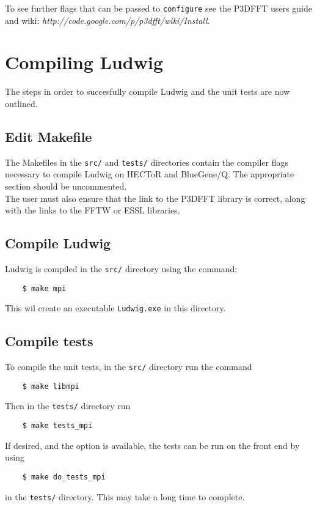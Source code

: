 \documentclass[12pt,a4paper]{article}
\begin{document}
To see further flags that can be passed to \texttt{configure} see the P3DFFT users guide and wiki: \textit{http://code.google.com/p/p3dfft/wiki/Install}.

\section{Compiling Ludwig}
The steps in order to succesfully compile Ludwig and the unit tests are now outlined.

\subsection{Edit Makefile}
  The Makefiles in the \texttt{src/} and \texttt{tests/} directories contain the compiler flags necessary to compile Ludwig on HECToR and BlueGene/Q. The appropriate section should be uncommented.\\
  The user must also ensure that the link to the P3DFFT library is correct, along with the links to the FFTW or ESSL libraries.

\subsection{Compile Ludwig}
  Ludwig is compiled in the \texttt{src/} directory using the command:
  \begin{verbatim}
    $ make mpi
  \end{verbatim}
  This wil create an executable \texttt{Ludwig.exe} in this directory.

\subsection{Compile tests}
  To compile the unit tests, in the \texttt{src/} directory run the command
  \begin{verbatim}
    $ make libmpi
  \end{verbatim}
  Then in the \texttt{tests/} directory run
  \begin{verbatim}
    $ make tests_mpi
  \end{verbatim}
  If desired, and the option is available, the tests can be run on the front end by using
  \begin{verbatim}
    $ make do_tests_mpi
  \end{verbatim}
  in the \texttt{tests/} directory. This may take a long time to complete.
\end{document}
